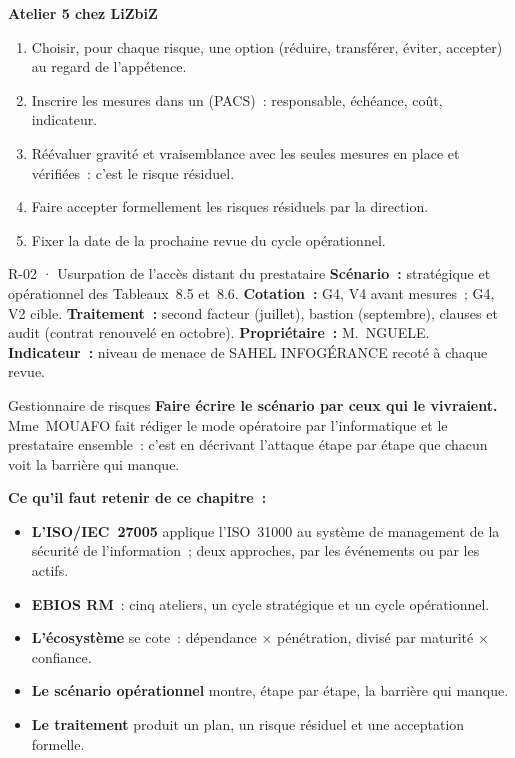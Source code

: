 \begin{boxprocedure}
\textbf{Atelier 5 chez LiZbiZ}
\begin{enumerate}
    \item Choisir, pour chaque risque, une option (réduire, transférer,
          éviter, accepter) au regard de l'appétence.
    \item Inscrire les mesures dans un  (PACS)~: responsable, échéance, coût,
          indicateur.
    \item Réévaluer gravité et vraisemblance avec les seules mesures en
          place et vérifiées~: c'est le risque résiduel.
    \item Faire accepter formellement les risques résiduels par la
          direction.
    \item Fixer la date de la prochaine revue du cycle opérationnel.
\end{enumerate}
\end{boxprocedure}

\begin{boxobjet}{R-02 · Usurpation de l'accès distant du prestataire}
\textbf{Scénario~:} stratégique et opérationnel des Tableaux~8.5 et~8.6.
\textbf{Cotation~:} G4, V4 avant mesures~; G4, V2 cible.
\textbf{Traitement~:} second facteur (juillet), bastion (septembre),
clauses et audit (contrat renouvelé en octobre). \textbf{Propriétaire~:}
M.~NGUELE. \textbf{Indicateur~:} niveau de menace de SAHEL INFOGÉRANCE
recoté à chaque revue.
\end{boxobjet}

\begin{boxmetier}{Gestionnaire de risques}
\textbf{Faire écrire le scénario par ceux qui le vivraient.} Mme~MOUAFO
fait rédiger le mode opératoire par l'informatique et le prestataire
ensemble~: c'est en décrivant l'attaque étape par étape que chacun voit la
barrière qui manque.
\end{boxmetier}

\separateur

\begin{boxresume}
\textbf{Ce qu'il faut retenir de ce chapitre~:}
\begin{itemize}
    \item \textbf{L'ISO/IEC~27005} applique l'ISO~31000 au système de
          management de la sécurité de l'information~; deux approches, par
          les événements ou par les actifs.
    \item \textbf{EBIOS RM}~: cinq ateliers, un cycle stratégique et un cycle
          opérationnel.
    \item \textbf{L'écosystème} se cote~: dépendance × pénétration, divisé
          par maturité × confiance.
    \item \textbf{Le scénario opérationnel} montre, étape par étape, la
          barrière qui manque.
    \item \textbf{Le traitement} produit un plan, un risque résiduel et une
          acceptation formelle.
\end{itemize}
\end{boxresume}

